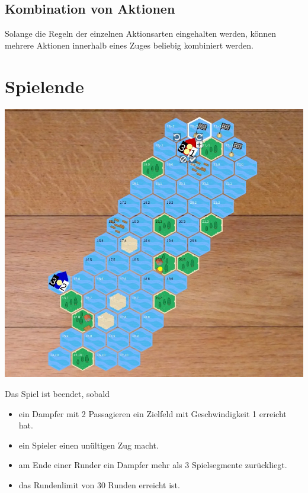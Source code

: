 \documentclass[12pt,a4paper, ngerman, oneside]{scrartcl}
\begin{document}
\subsection{Kombination von Aktionen}

Solange die Regeln der einzelnen Aktionsarten eingehalten werden, können mehrere
Aktionen innerhalb eines Zuges beliebig kombiniert werden.

\section{Spielende}

\begin{centering}
  \includegraphics[width=\textwidth]{bilder/spielfeld-ziel.jpg}
\end{centering}

Das Spiel ist beendet, sobald

\begin{itemize}
\item ein Dampfer mit 2 Passagieren ein Zielfeld mit Geschwindigkeit 1 erreicht hat.
\item ein Spieler einen unültigen Zug macht.
\item am Ende einer Runder ein Dampfer mehr als 3 Spielsegmente zurückliegt.
  \item das Rundenlimit von 30 Runden erreicht ist.
\end{itemize}
\end{document}
